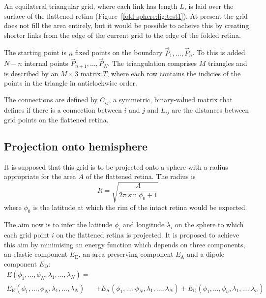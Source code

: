 \documentclass{article}
\begin{document}
An equilateral triangular grid, where each link has length $L$, is
laid over the surface of the flattened retina
(Figure~\ref{fold-sphere:fig:test1}). At present the grid does not
fill the area entirely, but it would be possible to acheive this by
creating shorter links from the edge of the current grid to the edge
of the folded retina. 

The starting point is $n$ fixed points on the boundary
$\vec{P}_1,\dots,\vec{P}_n$. To this is added $N-n$ internal points
$\vec{P}_{n+1},\dots,\vec{P}_N$. The triangulation comprises $M$
triangles and is described by an $M\times3$ matrix $T$, where each row
contains the indicies of the points in the triangle in anticlockwise order.

The connections are defined by $C_{ij}$, a symmetric, binary-valued
matrix that defines if there is a connection between $i$ and $j$ and
$L_{ij}$ are the distances between grid points on the flattened
retina.

\subsection{Projection onto hemisphere}
\label{fold-sphere:sec:proj-onto-hemisph}

It is supposed that this grid is to be projected onto a sphere with a
radius appropriate for the area $A$ of the flattened retina. The
radius is
\begin{equation}
  \label{fold-sphere:eq:1}
  R = \sqrt{\frac{A}{2\pi\sin\phi_0+1}}
\end{equation}
where $\phi_0$ is the latitude at which the rim of the intact retina
would be expected.

The aim now is to infer the latitude $\phi_i$ and longitude
$\lambda_i$ on the sphere to which each grid point $i$ on the
flattened retina is projected.  It is proposed to achieve this aim by
minimising an energy function which depends on three components, an
elastic component $E_\mathrm{E}$, an area-preserving component
$E_\mathrm{A}$ and a dipole component $E_\mathrm{D}:$
\begin{equation}
  \begin{split}
  E(\phi_1,\dots,\phi_N,\lambda_1,\dots,\lambda_N) = & \\
  E_\mathrm{E}(\phi_1,\dots,\phi_N,\lambda_1,\dots,\lambda_N) 
  & + E_\mathrm{A}(\phi_1,\dots,\phi_N,\lambda_1,\dots,\lambda_N) 
  + E_\mathrm{D}(\phi_1,\dots,\phi_n,\lambda_1,\dots,\lambda_n)
  \end{split}
\end{equation}
\end{document}
